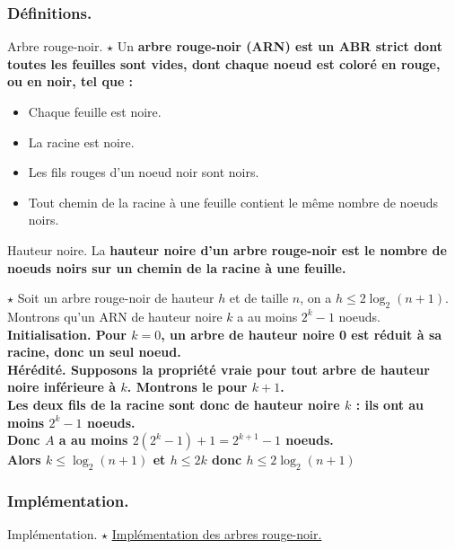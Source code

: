 \documentclass[french, 11pt]{article}
\begin{document}
\subsubsection{Définitions.}
\begin{defi}{Arbre rouge-noir. $\star$}{}
    Un \bf{arbre rouge-noir (ARN)} est un ABR strict dont toutes les feuilles sont vides, dont chaque noeud est coloré en rouge, ou en noir, tel que :
    \begin{itemize}[topsep=0pt,itemsep=-0.9 ex]
        \item Chaque feuille est noire.
        \item La racine est noire.
        \item Les fils rouges d'un noeud noir sont noirs.
        \item Tout chemin de la racine à une feuille contient le même nombre de noeuds noirs.
    \end{itemize}
\end{defi}

\begin{defi}{Hauteur noire.}{}
    La \bf{hauteur noire} d'un arbre rouge-noir est le nombre de noeuds noirs sur un chemin de la racine à une feuille.
\end{defi}

\begin{prop}{$\star$}{}
    Soit un arbre rouge-noir de hauteur $h$ et de taille $n$, on a $h\leq 2\log_2(n+1)$.
    \tcblower
    Montrons qu'un ARN de hauteur noire $k$ a au moins $2^k-1$ noeuds.\\
    \bf{Initialisation.} Pour $k=0$, un arbre de hauteur noire 0 est réduit à sa racine, donc un seul noeud.\\
    \bf{Hérédité.} Supposons la propriété vraie pour tout arbre de hauteur noire inférieure à $k$. Montrons le pour $k+1$.\\
    Les deux fils de la racine sont donc de hauteur noire $k$ : ils ont au moins $2^k-1$ noeuds.\\
    Donc $A$ a au moins $2(2^k-1)+1=2^{k+1}-1$ noeuds.\\
    Alors $k \leq \log_2(n+1)$ et $h\leq2k$ donc $h\leq2\log_2(n+1)$
\end{prop}

\subsubsection{Implémentation.}
\begin{thm}{Implémentation. $\star$}{}
    \href{https://anthonylick.com/wp-content/uploads/mp2i\_chap16.pdf}{Implémentation des arbres rouge-noir.}
\end{thm}
\end{document}
